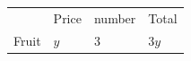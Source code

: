{\begin{mdframed}[linewidth=4, leftmargin=40, rightmargin=40]
\begin{exercise}
\begin{enumerate}[noitemsep, label=\textbf{Step} \textbf{\arabic*}. ]
{\begin{center}
\begin{xtabular*}{\mytablewidth}[t]{|p{10\mystarwidth}|p{10\mystarwidth}|p{10\mystarwidth}|p{10\mystarwidth}|}
    
         &
    
    
        Price &
    
    
        number &
    
    
        Total%
     \tabularnewline{}
    
    
        Fruit &
    
    
        
                  \begin{math}y\end{math}
                 &
    
    
        3 &
    
    
        
                  \begin{math}3y\end{math}
     \tabularnewline{}
    

\end{xtabular*}
\end{center}}
\end{enumerate}
\end{exercise}
\end{mdframed}}
